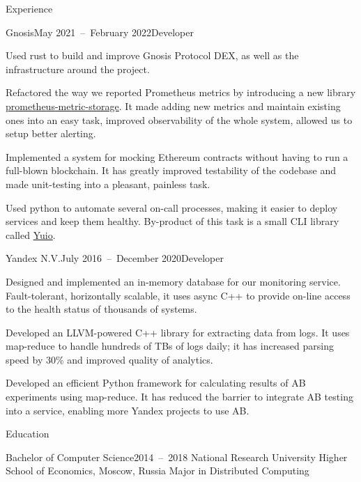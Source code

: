 \documentclass{resume}
\begin{document}
    \begin{rSection}{Experience}
        \begin{rSubsection}{Gnosis}{May 2021~--~February 2022}{Developer}{}
            \item
                Used rust to build and improve Gnosis Protocol DEX,
                as well as the infrastructure around the project.
            \item
                Refactored the way we reported Prometheus metrics
                by introducing a new library
                \href{https://github.com/taminomara/prometheus-metric-storage}{prometheus-metric-storage}.
                It made adding new metrics
                and maintain existing ones into an easy task,
                improved observability of the whole system,
                allowed us to setup better alerting.
            \item
                Implemented a system for mocking Ethereum contracts
                without having to run a full-blown blockchain.
                It has greatly improved testability of the codebase
                and made unit-testing into a pleasant, painless task.
            \item
                Used python to automate several on-call processes,
                making it easier to deploy services and keep them healthy.
                By-product of this task is a small CLI library called
                \href{https://github.com/taminomara/yuio}{Yuio}.
        \end{rSubsection}

        \begin{rSubsection}{Yandex N.V.}{July 2016~--~December 2020}{Developer}{}
            \item
                Designed and implemented an in-memory database
                for our monitoring service.
                Fault-tolerant, horizontally scalable,
                it uses async C++ to provide on-line access
                to the health status of thousands of systems.
            \item
                Developed an LLVM-powered C++ library
                for extracting data from logs.
                It uses map-reduce to handle hundreds of TBs of logs daily;
                it has increased parsing speed
                by 30\% and improved quality of analytics.
            \item
                Developed an efficient Python framework
                for calculating results of AB experiments using map-reduce.
                It has reduced the barrier
                to integrate AB testing into a service,
                enabling more Yandex projects to use AB\@.
        \end{rSubsection}
    \end{rSection}

    \begin{rSection}{Education}
        \begin{rSubsection}{Bachelor of Computer Science}{2014~--~2018}
        {National Research University Higher School of Economics, Moscow, Russia}{}
            Major in Distributed Computing
        \end{rSubsection}
    \end{rSection}
\end{document}
